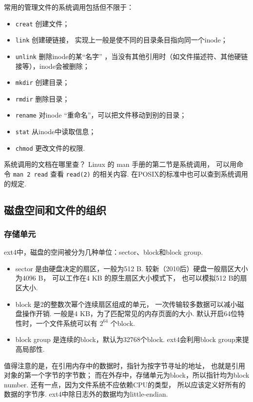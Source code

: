 常用的管理文件的系统调用包括但不限于：
\begin{itemize}
	\item \lstinline{creat} 创建文件；
	\item \lstinline{link} 创建硬链接，
	      实现上一般是使不同的目录条目指向同一个inode；
	\item \lstinline{unlink} 删除inode的某“名字”
	      ，当没有其他引用时（如文件描述符、其他硬链接等），inode会被删除；
	\item \lstinline{mkdir} 创建目录；
	\item \lstinline{rmdir} 删除目录；
	\item \lstinline{rename} 对inode “重命名”，可以把文件移动到别的目录；
	\item \lstinline{stat} 从inode中读取信息；
	\item \lstinline{chmod} 更改文件的权限.
\end{itemize}

\begin{qbox}{系统调用的文档在哪里查？}
	Linux 的 man 手册的第二节是系统调用，
	可以用命令 \lstinline{man 2 read} 查看 \lstinline{read(2)} 的相关内容.
	在POSIX的标准中也可以查到系统调用的规定.
\end{qbox}

\subsection{磁盘空间和文件的组织}
\subsubsection{存储单元} \label{fs units}
ext4中，磁盘的空间被分为几种单位：sector、block和block group.
\begin{itemize}
	\item sector 是由硬盘决定的扇区，一般为512 B.
	      较新（2010后）硬盘一般扇区大小为4096 B，
	      可以工作在4 KB 的原生扇区大小模式下，
	      也可以模拟512 B的扇区大小.
	\item block 是2的整数次幂个连续扇区组成的单元，
	      一次传输较多数据可以减小磁盘操作开销.
	      一般是4 KB，为了匹配常见的内存页面的大小.
	      默认开启64位特性时，一个文件系统可以有 $2^{64}$ 个block.
	\item block group 是连续的block，默认为32768个block. 
	      ext4会利用block group来提高局部性.
\end{itemize}
值得注意的是，在引用内存中的数据时，指针为按字节寻址的地址，
也就是引用对象的第一个字节的字节数；
而在外存中，存储单元为block，所以指针均为block number.
还有一点，因为文件系统不应依赖CPU的类型，
所以应该定义好所有的数据的字节序.
ext4中除日志外的数据均为little-endian.

